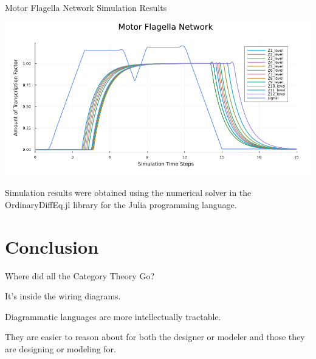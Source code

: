 \documentclass{beamer}
\begin{document}
\begin{frame}{Motor Flagella Network Simulation Results}

    \begin{center}
        \includegraphics[scale=0.40]{motor_flagella.png}
    \end{center}

    \begin{footnotesize}
        Simulation results were obtained using the numerical solver in the OrdinaryDiffEq.jl library for the Julia programming language.
    \end{footnotesize}
\end{frame}


\section{Conclusion}


\begin{frame}{Where did all the Category Theory Go?}
    \begin{large}
        It's inside the wiring diagrams.

        \vspace*{0.25in}
        Diagrammatic languages are more intellectually tractable.

        \vspace*{0.25in}
        They are easier to reason about for both the designer or modeler and those they are designing or modeling for.

    \end{large}

\end{frame}
\end{document}
